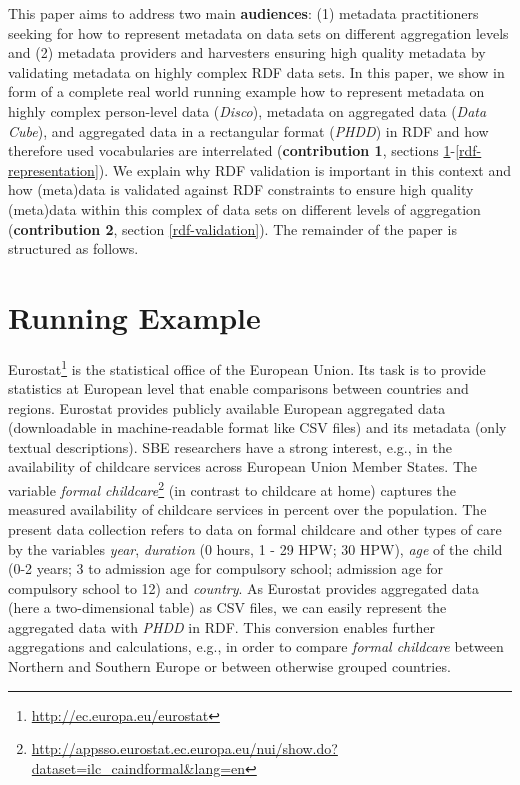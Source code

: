 \documentclass{llncs}
\begin{document}
This paper aims to address two main \textbf{audiences}: 
(1) metadata practitioners seeking for how to represent metadata on data sets on different aggregation levels and
(2) metadata providers and harvesters ensuring high quality metadata by validating metadata on highly complex RDF data sets.
In this paper, we show in form of a complete real world running example how to represent metadata on highly complex person-level data (\emph{Disco}), metadata on aggregated data (\emph{Data Cube}), and aggregated data in a rectangular format (\emph{PHDD}) in RDF and how therefore used vocabularies are interrelated (\textbf{contribution 1}, sections \ref{running-example}-\ref{rdf-representation}).
We explain why RDF validation is important in this context and how (meta)data is validated against RDF constraints to ensure high quality (meta)data within this complex of data sets on different levels of aggregation (\textbf{contribution 2}, section \ref{rdf-validation}). 
The remainder of the paper is structured as follows.

\section{Running Example}
\label{running-example}

Eurostat\footnote{\url{http://ec.europa.eu/eurostat}} is the statistical office of the European Union. Its task is to provide statistics at European level that enable comparisons between countries and regions.
Eurostat provides publicly available European aggregated data (downloadable in machine-readable format like CSV files) and its metadata (only textual descriptions).
SBE researchers have a strong interest, e.g., in the availability of childcare services across European Union Member States.
The variable \emph{formal childcare}\footnote{\url{http://appsso.eurostat.ec.europa.eu/nui/show.do?dataset=ilc_caindformal&lang=en}} (in contrast to childcare at home)
captures the measured availability of childcare services in percent over the population.
The present data collection refers to data on formal childcare and other types of care by the variables \emph{year}, \emph{duration} (0 hours, 1 - 29 HPW; 30 HPW), \emph{age} of the child (0-2 years; 3 to admission age for compulsory school; admission age for compulsory school to 12) and \emph{country}.
As Eurostat provides aggregated data (here a two-dimensional table) as CSV files, we can easily represent the aggregated data with \emph{PHDD} in RDF. 
This conversion enables further aggregations and calculations, e.g., in order to compare \emph{formal childcare} between Northern and Southern Europe or between otherwise grouped countries.
\end{document}
